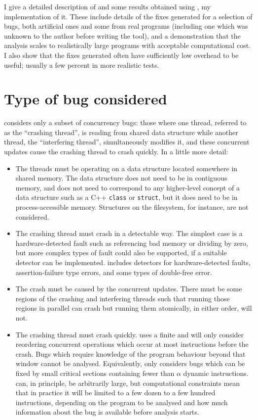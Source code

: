 I give a detailed description of {\technique} and some results
obtained using \implementation, my implementation of it.  These
include details of the fixes generated for a selection of bugs, both
artificial ones and some from real programs (including one which was
unknown to the author before writing the tool), and a demonstration
that the analysis scales to realistically large programs with
acceptable computational cost.  I also show that the fixes generated
often have sufficiently low overhead to be useful; usually a few
percent in more realistic tests.

\section{Type of bug considered}

{\Technique} considers only a subset of concurrency bugs: those where
one thread, referred to as the ``crashing thread'', is reading from
shared data structure while another thread, the ``interfering
thread'', simultaneously modifies it, and these concurrent updates
cause the crashing thread to crash quickly.  In a little more detail:

\begin{itemize}
\item The threads must be operating on a data structure located
  somewhere in shared memory.  The data structure does not need to be
  in contiguous memory, and does not need to correspond to any
  higher-level concept of a data structure such as a C++
  \texttt{class} or \texttt{struct}, but it does need to be in
  process-accessible memory.  Structures on the filesystem, for
  instance, are not considered.
\item The crashing thread must crash in a detectable way.  The
  simplest case is a hardware-detected fault such as referencing bad
  memory or dividing by zero, but more complex types of fault could
  also be supported, if a suitable detector can be implemented.
  {\Implementation} includes detectors for hardware-detected faults,
  assertion-failure type errors, and some types of double-free error.
\item The crash must be caused by the concurrent updates.  There must
  be some regions of the crashing and interfering threads such that
  running those regions in parallel can crash but running them
  atomically, in either order, will not.
\item The crashing thread must crash quickly.  {\Technique} uses a
  finite  \introduction{$\alpha$} and
  will only consider reordering concurrent operations which occur at
  most \backref{$\alpha$} instructions before the crash.  Bugs which
  require knowledge of the program behaviour beyond that window cannot
  be analysed.  Equivalently, {\technique} only considers bugs which
  can be fixed by small critical sections containing fewer than
  $\alpha$ dynamic instructions.  \backref{$\alpha$} can, in
  principle, be arbitrarily large, but computational constraints mean
  that in practice it will be limited to a few dozen to a few hundred
  instructions, depending on the program to be analysed and how much
  information about the bug is available before analysis starts.
\end{itemize}

